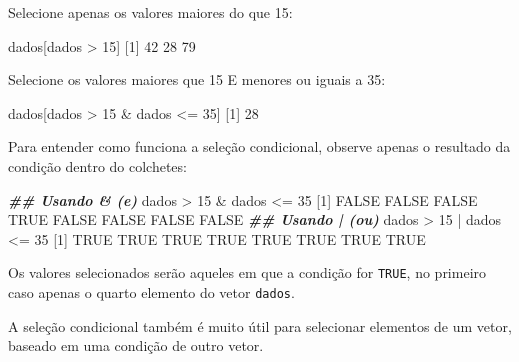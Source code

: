 \documentclass[
  10pt,
  a4paper]{book}
\newenvironment{Shaded}{\begin{snugshade}}{\end{snugshade}}
\newcommand{\ConstantTok}[1]{\textcolor[rgb]{0.00,0.00,0.00}{#1}}
\newcommand{\DecValTok}[1]{\textcolor[rgb]{0.00,0.00,0.81}{#1}}
\newcommand{\DocumentationTok}[1]{\textcolor[rgb]{0.56,0.35,0.01}{\textbf{\textit{#1}}}}
\newcommand{\NormalTok}[1]{#1}
\newcommand{\SpecialCharTok}[1]{\textcolor[rgb]{0.00,0.00,0.00}{#1}}
\begin{document}
Selecione apenas os valores maiores do que 15:

\begin{Shaded}
\begin{Highlighting}[]
\NormalTok{dados[dados }\SpecialCharTok{\textgreater{}} \DecValTok{15}\NormalTok{]}
\NormalTok{[}\DecValTok{1}\NormalTok{] }\DecValTok{42} \DecValTok{28} \DecValTok{79}
\end{Highlighting}
\end{Shaded}

Selecione os valores maiores que 15 E menores ou iguais a 35:

\begin{Shaded}
\begin{Highlighting}[]
\NormalTok{dados[dados }\SpecialCharTok{\textgreater{}} \DecValTok{15} \SpecialCharTok{\&}\NormalTok{ dados }\SpecialCharTok{\textless{}=} \DecValTok{35}\NormalTok{]}
\NormalTok{[}\DecValTok{1}\NormalTok{] }\DecValTok{28}
\end{Highlighting}
\end{Shaded}

Para entender como funciona a seleção condicional, observe apenas o
resultado da condição dentro do colchetes:

\begin{Shaded}
\begin{Highlighting}[]
\DocumentationTok{\#\# Usando \& (e)}
\NormalTok{dados }\SpecialCharTok{\textgreater{}} \DecValTok{15} \SpecialCharTok{\&}\NormalTok{ dados }\SpecialCharTok{\textless{}=} \DecValTok{35}
\NormalTok{[}\DecValTok{1}\NormalTok{] }\ConstantTok{FALSE} \ConstantTok{FALSE} \ConstantTok{FALSE}  \ConstantTok{TRUE} \ConstantTok{FALSE} \ConstantTok{FALSE} \ConstantTok{FALSE} \ConstantTok{FALSE}
\DocumentationTok{\#\# Usando | (ou)}
\NormalTok{dados }\SpecialCharTok{\textgreater{}} \DecValTok{15} \SpecialCharTok{|}\NormalTok{ dados }\SpecialCharTok{\textless{}=} \DecValTok{35}
\NormalTok{[}\DecValTok{1}\NormalTok{] }\ConstantTok{TRUE} \ConstantTok{TRUE} \ConstantTok{TRUE} \ConstantTok{TRUE} \ConstantTok{TRUE} \ConstantTok{TRUE} \ConstantTok{TRUE} \ConstantTok{TRUE}
\end{Highlighting}
\end{Shaded}

Os valores selecionados serão aqueles em que a condição for
\texttt{TRUE}, no primeiro caso apenas o quarto elemento do vetor \texttt{dados}.

A seleção condicional também é muito útil para selecionar elementos de
um vetor, baseado em uma condição de outro vetor.
\end{document}
